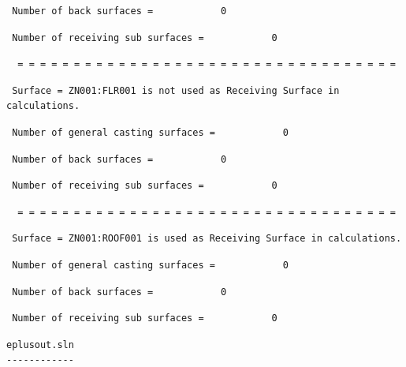 \begin{lstlisting}
 Number of back surfaces =            0
\end{lstlisting}

\begin{lstlisting}
 Number of receiving sub surfaces =            0
\end{lstlisting}

\begin{lstlisting}
  = = = = = = = = = = = = = = = = = = = = = = = = = = = = = = = = = =
\end{lstlisting}

\begin{lstlisting}
 Surface = ZN001:FLR001 is not used as Receiving Surface in calculations.
\end{lstlisting}

\begin{lstlisting}
 Number of general casting surfaces =            0
\end{lstlisting}

\begin{lstlisting}
 Number of back surfaces =            0
\end{lstlisting}

\begin{lstlisting}
 Number of receiving sub surfaces =            0
\end{lstlisting}

\begin{lstlisting}
  = = = = = = = = = = = = = = = = = = = = = = = = = = = = = = = = = =
\end{lstlisting}

\begin{lstlisting}
 Surface = ZN001:ROOF001 is used as Receiving Surface in calculations.
\end{lstlisting}

\begin{lstlisting}
 Number of general casting surfaces =            0
\end{lstlisting}

\begin{lstlisting}
 Number of back surfaces =            0
\end{lstlisting}

\begin{lstlisting}
 Number of receiving sub surfaces =            0
\end{lstlisting}

\begin{lstlisting}
eplusout.sln
------------
\end{lstlisting}

